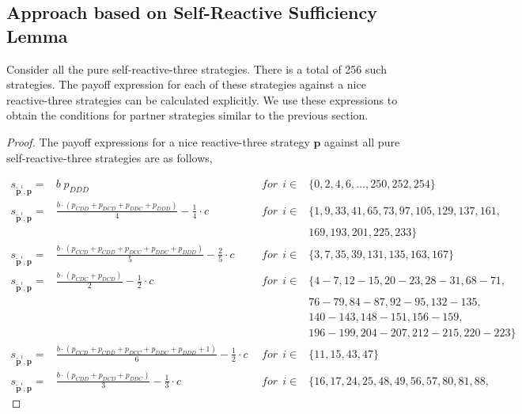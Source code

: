 \documentclass{article}
\theoremstyle{definition}
\begin{document}
\subsection{Approach based on Self-Reactive Sufficiency Lemma}

Consider all the pure self-reactive-three strategies. There is
a total of 256 such strategies. The payoff expression for each of
these strategies against a nice reactive-three strategies can be calculated
explicitly. We use these expressions to obtain the conditions for partner
strategies similar to the previous section.

\begin{proof}
The payoff expressions for a nice reactive-three strategy $\mathbf{p}$ against all
pure self-reactive-three strategies are as follows,

\small{
\begin{equation}\label{Eq:PayoffExpressionsReactiveThree}
\begin{array}{lcll}
  s_{\mathbf{\tilde{p}}^{i}, \mathbf{p}} = & b \; p_{DDD} & ~~for~~ i \in & \{0, 2, 4, 6, \dots, 250, 252, 254\} \\ [0.1cm]
    s_{\mathbf{\tilde{p}}^{i}, \mathbf{p}} = & \frac{b \cdot (p_{CDD} + p_{DCD} + p_{DDC} + p_{DDD})}{4} - \frac{1}{4} \cdot c & ~~for~~ i \in & \{ 1, 9, 33, 41, 65, 73, 97, 105, 129, 137, 161,
    \\ & & &  169, 193, 201, 225, 233\} \\ [0.1cm]
    s_{\mathbf{\tilde{p}}^{i}, \mathbf{p}} = & \frac{b \cdot \left(p_{CCD} + p_{CDD} + p_{DCC} + p_{DDC} + p_{DDD}\right)}{5} - \frac{2}{5} \cdot c & ~~for~~ i \in & \{ 3, 7, 35, 39, 131, 135, 163, 167\} \\ [0.2cm]
    s_{\mathbf{\tilde{p}}^{i}, \mathbf{p}} = & \frac{b \cdot \left(p_{CDC} + p_{DCD}\right)}{2} - \frac{1}{2} \cdot c & ~~for~~ i \in & \{ 4 \!- \!7, 12 \!- \!15, 20 \!- \!23, 28 \!- \!31, 68 \!- \!71,
    \\ & & &  76 \!- \!79, 84 \!- \!87, 92 \!- \!95, 132 \!- \!135, 
    \\ & & & 140 \!- \!143, 148- 151, 156 \!- \!159, 
    \\ & & & 196 \!- \!199, 204 \!- \!207, 212 \!- \!215, 220 \!- \!223\} \\ 
    s_{\mathbf{\tilde{p}}^{i}, \mathbf{p}} = & \frac{b \cdot \left(p_{CCD} + p_{CDD} + p_{DCC} + p_{DDC} + p_{DDD} + 1\right)}{6} - \frac{1}{2} \cdot c & ~~for~~ i \in & \{ 11, 15, 43, 47\} \\ [0.2cm]
    s_{\mathbf{\tilde{p}}^{i}, \mathbf{p}} = & \frac{b \cdot \left(p_{CDD} + p_{DCD} + p_{DDC}\right)}{3} - \frac{1}{3} \cdot c & ~~for~~ i \in & \{16,17,24,25,48,49,56,57,80,81,88,

\end{array}
\end{equation}}
\end{proof}
\end{document}
